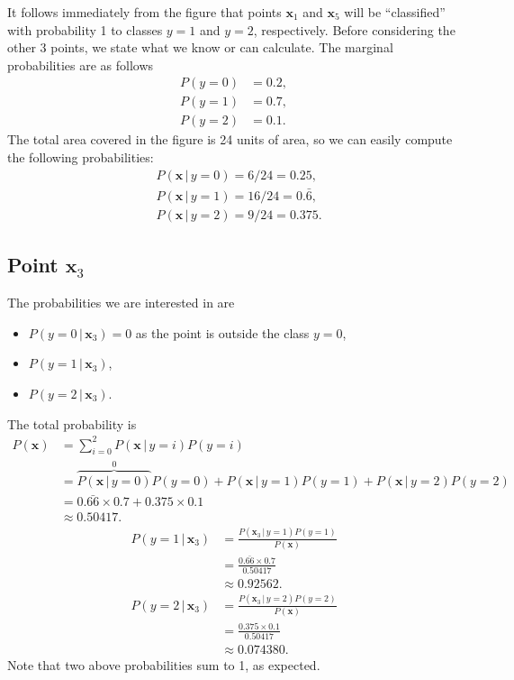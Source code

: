 \documentclass[10pt]{article}
\begin{document}
\color{black}
\noindent It follows immediately from the figure that points $\textbf{x}_1$ and $\textbf{x}_5$ will be ``classified'' with probability 1 to classes $y = 1$ and $y = 2$, respectively. Before considering the other 3 points, we state what we know or can calculate. The marginal probabilities are as follows
\begin{align*}
P(y = 0) &= 0.2, \\
P(y = 1) &= 0.7, \\
P(y = 2) &= 0.1.
\end{align*}
The total area covered in the figure is 24 units of area, so we can easily compute the following probabilities:
\begin{align*}
&P(\textbf{x} \, | \, y = 0) = 6 / 24 = 0.25, \\
&P(\textbf{x} \, | \, y = 1) = 16 / 24 = 0.\bar{6}, \\
&P(\textbf{x} \, | \, y = 2) = 9 / 24 = 0.375. 
\end{align*}

\subsection*{Point $\textbf{x}_3$}
The probabilities we are interested in are
\begin{itemize}
  \item $P(y = 0 \, | \, \textbf{x}_3) = 0$ as the point is outside the class $y = 0$,
  \item $P(y = 1 \, | \, \textbf{x}_3)$,
  \item $P(y = 2 \, | \, \textbf{x}_3)$.
\end{itemize}
The total probability is
\begin{align*}
P(\textbf{x}) &= \sum_{i = 0}^2 P(\textbf{x} \, | \, y = i)P(y = i) \\
                    &= \overbrace{P(\textbf{x} \, | \, y = 0)}^0 P(y = 0) + P(\textbf{x} \, | \, y = 1)P(y = 1) + P(\textbf{x} \, | \, y = 2)P(y = 2) \\
                    &= 0.\bar{66} \times 0.7 + 0.375 \times 0.1 \\
                    &\approx 0.50417.
\end{align*}
\begin{align*}
P(y = 1 \, | \, \textbf{x}_3) &= \frac{ P( \textbf{x}_3 \, | \, y = 1)P(y = 1)}{ P(\textbf{x}) } \\
                                          &= \frac{ 0.\bar{66} \times 0.7}{0.50417} \\
                                          &\approx 0.92562. \\
P(y = 2 \, | \, \textbf{x}_3) &= \frac{P(\textbf{x}_3 \, | \, y = 2)P(y = 2)}{P(\textbf{x})} \\
                                          &= \frac{0.375 \times 0.1}{0.50417} \\
                                          &\approx 0.074380. 
\end{align*}
Note that two above probabilities sum to 1, as expected.
\end{document}
